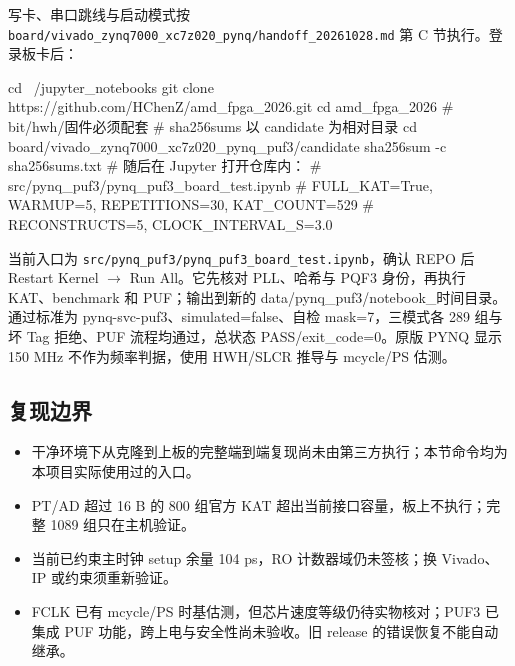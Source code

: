 写卡、串口跳线与启动模式按 \texttt{board/\allowbreak{}vivado\_\allowbreak{}zynq7000\_\allowbreak{}xc7z020\_\allowbreak{}pynq/\allowbreak{}handoff\_\allowbreak{}20261028.\allowbreak{}md} 第 C 节执行。登录板卡后：

\begin{codeblock}[samepage=true]
cd ~/jupyter_notebooks
git clone https://github.com/HChenZ/amd_fpga_2026.git
cd amd_fpga_2026
# bit/hwh/固件必须配套
# sha256sums 以 candidate 为相对目录
cd board/vivado_zynq7000_xc7z020_pynq_puf3/candidate
sha256sum -c sha256sums.txt
# 随后在 Jupyter 打开仓库内：
# src/pynq_puf3/pynq_puf3_board_test.ipynb
# FULL_KAT=True, WARMUP=5, REPETITIONS=30, KAT_COUNT=529
# RECONSTRUCTS=5, CLOCK_INTERVAL_S=3.0
\end{codeblock}

当前入口为 \texttt{src/pynq\_puf3/pynq\_puf3\_board\_test.ipynb}，确认 REPO 后 Restart Kernel $\rightarrow$ Run All。它先核对 PLL、哈希与 PQF3 身份，再执行 KAT、benchmark 和 PUF；输出到新的 data/pynq\_puf3/notebook\_时间目录。通过标准为 pynq-svc-puf3、simulated=false、自检 mask=7，三模式各 289 组与坏 Tag 拒绝、PUF 流程均通过，总状态 PASS/exit\_code=0。原版 PYNQ 显示 150 MHz 不作为频率判据，使用 HWH/SLCR 推导与 mcycle/PS 估测。

\Needspace{85pt}

\subsection{复现边界}

\begin{itemize}
\tightlist
\item
  干净环境下从克隆到上板的完整端到端复现尚未由第三方执行；本节命令均为本项目实际使用过的入口。
\item
  PT/AD 超过 16 B 的 800 组官方 KAT 超出当前接口容量，板上不执行；完整 1089 组只在主机验证。
\item
  当前已约束主时钟 setup 余量 104 ps，RO 计数器域仍未签核；换 Vivado、IP 或约束须重新验证。
\item
  FCLK 已有 mcycle/PS 时基估测，但芯片速度等级仍待实物核对；PUF3 已集成 PUF 功能，跨上电与安全性尚未验收。旧 release 的错误恢复不能自动继承。
\end{itemize}
